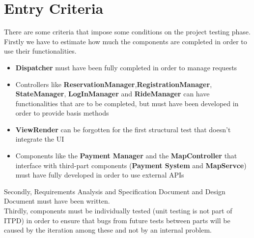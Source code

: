 \documentclass[11pt,a4paper]{report}
\begin{document}
\section{Entry Criteria}
There are some criteria that impose some conditions on the project testing phase.\\
Firstly we have to estimate how much the components are completed in order to use their functionalities.
\begin{itemize}
	\item \textbf{Dispatcher} must have been fully completed in order to manage requests
	\item Controllers like \textbf{ReservationManager},\textbf{RegistrationManager}, \textbf{StateManager}, \textbf{LogInManager} and \textbf{RideManager} can have functionalities that are to be completed, but must have been developed in order to provide basis methods
	\item \textbf{ViewRender} can be forgotten for the first structural test that doesn't integrate the UI
	\item Components like the \textbf{Payment Manager} and the \textbf{MapController} that interface with third-part components (\textbf{Payment System} and \textbf{MapServce}) must have fully developed in order to use external APIs
\end{itemize}
Secondly, Requirements Analysis and Specification Document and Design Document must have been written.\\
Thirdly, components must be individually tested (unit testing is not part of ITPD) in order to ensure that bugs from future tests between parts will be caused by the iteration among these and not by an internal problem.
\end{document}
